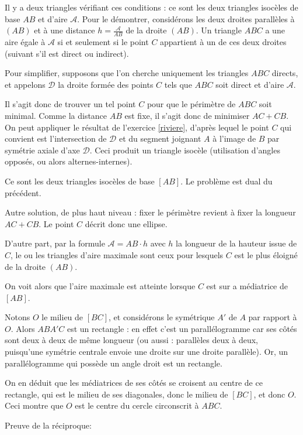 \begin{Soln}{33}
Il y a deux triangles vérifiant ces conditions : ce sont les deux triangles isocèles de base $AB$ et d'aire $\mathcal A$. Pour le démontrer, considérons les deux droites parallèles à $(AB)$ et à une distance $h =\frac{\mathcal A}{ AB}$ de la droite $(AB)$. Un triangle $ABC$ a une aire égale à $\mathcal A$ si et seulement si le point $C$ appartient à un de ces deux droites (suivant s'il est direct ou indirect).

Pour simplifier, supposons que l'on cherche uniquement les triangles $ABC$ directs, et appelons $\mathcal D$ la droite formée des points $C$ tels que $ABC$ soit direct et d'aire $\mathcal A$.

Il s'agit donc de trouver un tel point $C$ pour que le périmètre de $ABC$ soit minimal. Comme la distance $AB$ est fixe, il s'agit donc de minimiser $AC+CB$. On peut appliquer le résultat de l'exercice \ref{riviere}, d'après lequel le point $C$ qui convient est l'intersection de $\mathcal D$ et du segment joignant $A$ à l'image de $B$ par symétrie axiale d'axe $\mathcal D$. Ceci produit un triangle isocèle (utilisation d'angles opposés, ou alors alternes-internes).
\end{Soln}
\begin{Soln}{34}


Ce sont les deux triangles isocèles de base $[AB]$. Le problème est dual du précédent.

Autre solution, de plus haut niveau : fixer le périmètre revient à fixer la longueur $AC+CB$. Le point $C$ décrit donc une ellipse.

D'autre part,  par la formule $\mathcal A = AB \cdot h$ avec $h$ la longueur de la hauteur issue de $C$, le  ou les triangles d'aire maximale sont ceux pour lesquels $C$ est le plus éloigné de la droite $(AB)$.

On voit alors que l'aire maximale est atteinte lorsque $C$ est sur a médiatrice de $[AB]$.


\end{Soln}
\begin{Soln}{35}

Notons $O$ le milieu de $[BC]$, et considérons le symétrique $A'$ de $A$ par rapport à $O$. Alors $ABA'C$ est un rectangle : en effet c'est un parallélogramme car ses côtés sont deux à deux de même longueur (ou aussi : parallèles deux à deux, puisqu'une symétrie centrale envoie une droite sur une droite parallèle). Or, un parallélogramme qui possède un angle droit est un rectangle.

On en déduit que les médiatrices de ses côtés se croisent au centre de ce rectangle, qui est le milieu de ses diagonales, donc le milieu de $[BC]$, et donc $O$. Ceci montre que $O$ est le centre du cercle circonscrit à $ABC$.

Preuve de la réciproque:
\end{Soln}
